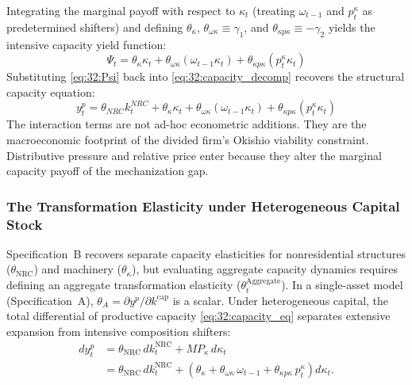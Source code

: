 Integrating the marginal payoff with respect to $\kappa_t$
(treating $\omega_{t-1}$ and $p^\kappa_t$ as predetermined
shifters) and defining $\theta_\kappa$,
$\theta_{\omega\kappa} \equiv \gamma_1$, and
$\theta_{\kappa p\kappa} \equiv -\gamma_2$ yields the
intensive capacity yield function:
\begin{equation}
	\Psi_t = \theta_\kappa \kappa_t
	+ \theta_{\omega\kappa} (\omega_{t-1} \kappa_t)
	+ \theta_{\kappa p\kappa} (p^\kappa_t \kappa_t)
	\label{eq:32:Psi}
\end{equation}
Substituting \eqref{eq:32:Psi} back into
\eqref{eq:32:capacity_decomp} recovers the structural
capacity equation:
\begin{equation}
	y^p_t = \theta_{NRC} k^{NRC}_t + \theta_\kappa \kappa_t
	+ \theta_{\omega\kappa} (\omega_{t-1} \kappa_t)
	+ \theta_{\kappa p\kappa} (p^\kappa_t \kappa_t)
	\label{eq:32:capacity_eq}
\end{equation}
The interaction terms are not ad-hoc econometric additions.
They are the macroeconomic footprint of the divided firm's
Okishio viability constraint. Distributive pressure and
relative price enter because they alter the marginal
capacity payoff of the mechanization gap.

\subsubsection{The Transformation Elasticity under Heterogeneous Capital Stock}


Specification~B recovers separate capacity elasticities for nonresidential structures ($\theta_{\text{NRC}}$) and machinery ($\theta_\kappa$), but evaluating aggregate capacity dynamics requires defining an aggregate transformation elasticity ($\theta^{\text{Aggregate}}_t$). In a single-asset model (Specification~A), $\theta_A = \partial y^p / \partial k^{\text{cap}}$ is a scalar. Under heterogeneous capital, the total differential of productive capacity \eqref{eq:32:capacity_eq} separates extensive expansion from intensive composition shifters:
\begin{align}
	dy^p_t &= \theta_{\text{NRC}}\, dk^{\text{NRC}}_t + MP_\kappa\, d\kappa_t
	\label{eq:32:dy_total} \\
	&= \theta_{\text{NRC}}\, dk^{\text{NRC}}_t
	+ \left(\theta_\kappa + \theta_{\omega\kappa}\, \omega_{t-1}
	+ \theta_{\kappa p\kappa}\, p^\kappa_t\right) d\kappa_t.
	\label{eq:32:dy_expanded}
\end{align}

